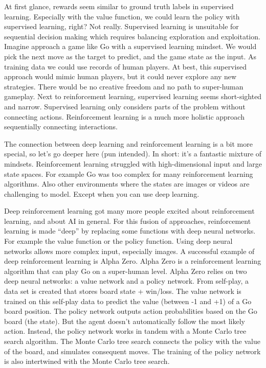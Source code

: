 \documentclass[
  10pt,
]{scrbook}
\begin{document}
At first glance, rewards seem similar to ground truth labels in supervised learning.
Especially with the value function, we could learn the policy with supervised learning, right?
Not really.
Supervised learning is unsuitable for sequential decision making which requires balancing exploration and exploitation.
Imagine approach a game like Go with a supervised learning mindset.
We would pick the next move as the target to predict, and the game state as the input.
As training data we could use records of human players.
At best, this supervised approach would mimic human players, but it could never explore any new strategies.
There would be no creative freedom and no path to super-human gameplay.
Next to reinforcement learning, supervised learning seems short-sighted and narrow.
Supervised learning only considers parts of the problem without connecting actions.
Reinforcement learning is a much more holistic approach sequentially connecting interactions.

The connection between deep learning and reinforcement learning is a bit more special, so let's go deeper here (pun intended).
In short: it's a fantastic mixture of mindsets.
Reinforcement learning struggled with high-dimensional input and large state spaces.
For example Go was too complex for many reinforcement learning algorithms.
Also other environments where the states are images or videos are challenging to model.
Except when you can use deep learning.

Deep reinforcement learning got many more people excited about reinforcement learning, and about AI in general.
For this fusion of approaches, reinforcement learning is made ``deep'' by replacing some functions with deep neural networks.
For example the value function or the policy function.
Using deep neural networks allows more complex input, especially images.
A successful example of deep reinforcement learning is Alpha Zero.
Alpha Zero is a reinforcement learning algorithm that can play Go on a super-human level.
Alpha Zero relies on two deep neural networks: a value network and a policy network.
From self-play, a data set is created that stores board state + win/loss.
The value network is trained on this self-play data to predict the value (between -1 and +1) of a Go board position.
The policy network outputs action probabilities based on the Go board (the state).
But the agent doesn't automatically follow the most likely action.
Instead, the policy network works in tandem with a Monte Carlo tree search algorithm.
The Monte Carlo tree search connects the policy with the value of the board, and simulates consequent moves.
The training of the policy network is also intertwined with the Monte Carlo tree search.
\end{document}
